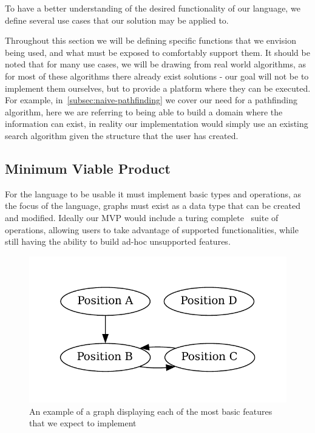 To have a better understanding of the desired functionality of our language, we define several use cases that our
solution may be applied to.

Throughout this section we will be defining specific functions that we envision being used, and what must be exposed to
comfortably support them.
It should be noted that for many use cases, we will be drawing from real world algorithms, as for most of these
algorithms there already exist solutions - our goal will not be to implement them ourselves, but to provide a platform
where they can be executed.
For example, in~\ref{subsec:naive-pathfinding} we cover our need for a pathfinding algorithm, here we are referring to
being able to build a domain where the information can exist, in reality our implementation would simply use an
existing search algorithm given the structure that the user has created.

\subsection{Minimum Viable Product}\label{subsec:minimum-viable-product}
For the language to be usable it must implement basic types and operations, as the focus of the language, graphs must
exist as a data type that can be created and modified.
Ideally our MVP would include a turing complete~\cite{TuringCompleteness} suite of operations, allowing users to take
advantage of supported functionalities, while still having the ability to build ad-hoc unsupported features.

\begin{figure}[H]
    \centering
    \includegraphics[width=12cm]{figures/example_graphs/basics.gv}
    \caption{An example of a graph displaying each of the most basic features that we expect to implement}
    \label{fig:example_basic_graph}
\end{figure}

